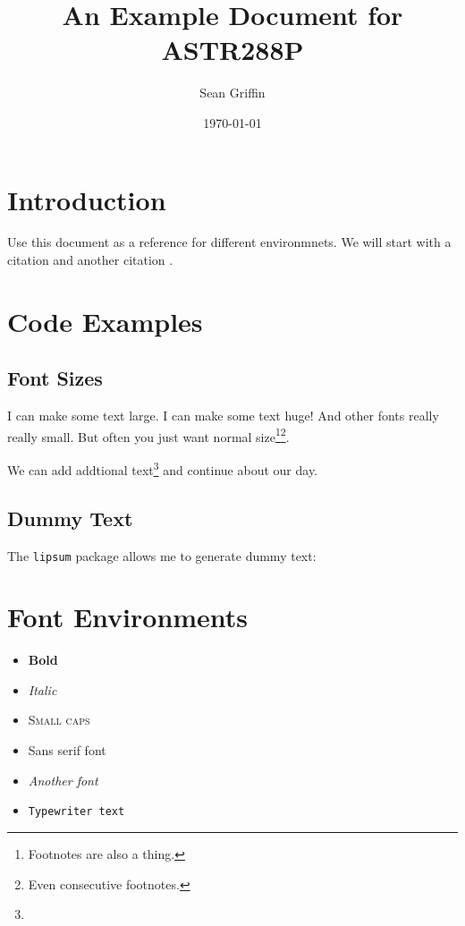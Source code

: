 \documentclass[12pt]{article}
\title{An Example Document for ASTR288P}
\author{Sean Griffin}
\date{\today}
\begin{document}
\maketitle
\thispagestyle{empty} %
\newpage


\tableofcontents
\newpage

\section{Introduction}
\label{sec:intro}

Use this document as a reference for different environmnets. We will start with a citation \cite{exampleArticle} and another citation \cite{2017APh....91...34A}.

\section{Code Examples}
\label{sec:methods}

\subsection{Font Sizes}


\large I can make some text large. \Huge I can make some text huge! \tiny And other fonts really really small. \normalsize But often you just want normal size\footnote{Footnotes are also a thing.}\footnote{Even consecutive footnotes.}. 

We can add addtional text\footnote{\lipsum[3]} and continue about our day.

\subsection{Dummy Text}
The \texttt{lipsum} package allows me to generate dummy text:

\lipsum[4-5]

\section{Font Environments}


\begin{itemize}
\item \textbf{Bold}
\item \textit{Italic}
\item \textsc{Small caps}
\item \textsf{Sans serif font}
\item \textsl{Another font}
\item \texttt{Typewriter text}
\end{itemize}
\end{document}
